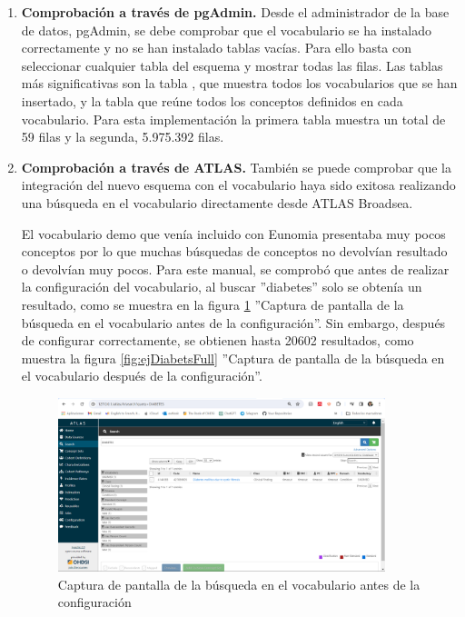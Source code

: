 \begin{enumerate}[label=\alph*]

    \item \textbf{Comprobación a través de pgAdmin.} Desde el administrador de la base de datos, pgAdmin, se debe comprobar que el vocabulario se ha instalado correctamente y no se han instalado tablas vacías. Para ello basta con seleccionar cualquier tabla del esquema  y mostrar todas las filas. Las tablas más significativas son la tabla , que muestra todos los vocabularios que se han insertado, y la tabla  que reúne todos los conceptos definidos en cada vocabulario. Para esta implementación la primera tabla muestra un total de 59 filas y la segunda, 5.975.392 filas.

    \item \textbf{Comprobación a través de ATLAS.} También se puede comprobar que la integración del nuevo esquema con el vocabulario haya sido exitosa realizando una búsqueda en el vocabulario directamente desde ATLAS Broadsea. 
    
    El vocabulario demo que venía incluido con Eunomia presentaba muy pocos conceptos por lo que muchas búsquedas de conceptos no devolvían resultado o devolvían muy pocos. Para este manual, se comprobó que antes de realizar la configuración del vocabulario, al buscar ''diabetes'' solo se obtenía un resultado, como se muestra en la figura \ref{fig:ejDiabetesVacio} ''Captura de pantalla de la búsqueda en el vocabulario antes de la configuración''. Sin embargo, después de configurar correctamente, se obtienen hasta 20602 resultados, como muestra la figura \ref{fig:ejDiabetsFull} ''Captura de pantalla de la búsqueda en el vocabulario después de la configuración''.

        \begin{figure}[H]
        \centering
        \includegraphics[width=0.90\textwidth]{figures/ejDiabetesVacio.png}
        \caption{Captura de pantalla de la búsqueda en el vocabulario antes de la configuración}
        \label{fig:ejDiabetesVacio}
    \end{figure}


\end{enumerate}
